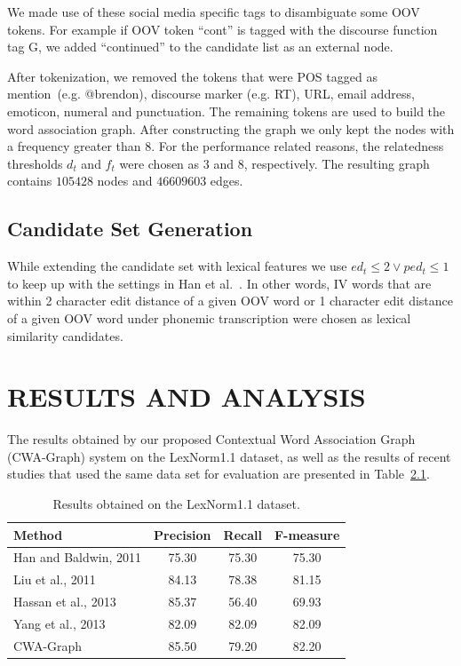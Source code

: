 \documentclass[a4paper,onesided,12pt]{report}
\begin{document}
We made use of these social media specific tags to disambiguate some OOV tokens. For example if OOV token ``cont'' is tagged with the discourse function tag G, we added ``continued'' to the candidate list as an external node.

After tokenization, we removed the tokens that were POS tagged as mention~(e.g. @brendon), discourse marker (e.g. RT), URL, email address, emoticon, numeral and punctuation. The remaining tokens are used to build the word association graph. After constructing the graph we only kept the nodes with a frequency greater than $8$. For the performance related reasons, the relatedness thresholds $d_t$ and $f_t$  were chosen as $3$ and $8$, respectively. The resulting graph contains $105428$ nodes and $46609603$ edges.

\section{Candidate Set Generation}

While extending the candidate set with lexical features we use ${ed_t \leq 2} \vee {ped_t \leq 1}$ to keep up with the settings in Han et al.~\cite{Han:2011:LNS:2002472.2002520}. In other words, IV words that are within 2 character edit distance of a given OOV word or 1 character edit distance of a given OOV word under phonemic transcription were chosen as lexical similarity candidates.

\chapter{RESULTS AND ANALYSIS}

The results obtained by our proposed Contextual Word Association Graph (CWA-Graph) system on the LexNorm1.1 dataset,
as well as the results of recent studies that used the same data set for evaluation are presented in Table~\ref{tab:results}.

\begin{table}[thb]
  \caption{Results obtained on the LexNorm1.1 dataset.}
  \centering
  \begin{tabular}[t]{lccc}
    \hline
    Method & Precision & Recall & F-measure \\
    \hline
    Han and Baldwin, 2011 & 75.30 & 75.30 & 75.30 \\
    Liu et al., 2011 & 84.13 & 78.38 & 81.15 \\
    Hassan et al., 2013 & 85.37 & 56.40 & 69.93 \\
    Yang et al., 2013 & 82.09 & 82.09 & 82.09 \\
    CWA-Graph   & 85.50 & 79.20 & 82.20 \\
    \hline
  \end{tabular}
  \label{tab:results}
\end{table}
\end{document}
